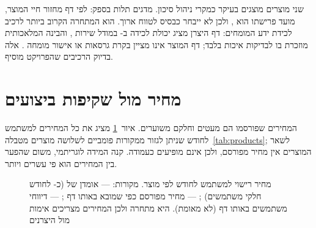 שני מוצרים מוצגים בעיקר כמקרי ניהול סיכון.  מדגים תלות בספק: לפי דף מחזור חיי המוצר, מועד
פרישתו הוא  \cite{microsoftguides}, ולכן לא ייבחר כבסיס לטווח ארוך.  הוא המתחרה הקרוב ביותר
לרכיב לכידת ידע המומחים: דף היצרן מציג יכולת לכידה ב- במודל שירות , והבינה המלאכותית מוזכרת בו לבדיקות איכות
בלבד; דף המוצר אינו מציין בקרת גרסאות או אישור מומחה \cite{vuforia}. אלה בדיוק הרכיבים שהפרויקט מוסיף.

\section{מחיר מול שקיפות ביצועים}\label{sec:pricecmp}
המחירים שפורסמו הם מעטים וחלקם משוערים. איור~\ref{fig:pricebar} מציג את כל המחירים למשתמש לחודש שניתן לגזור ממקורות
פומביים לשלושה מוצרים מטבלה~\ref{tab:products}; לשאר המוצרים אין מחיר מפורסם, ולכן אינם מופיעים כעמודה. קנה המידה לוגריתמי,
משום שהפער בין המחירים הוא פי עשרים ויותר.
\begin{figure}[!htbp]
\centering
{}
\caption[מחיר רישוי למשתמש לחודש]{מחיר רישוי למשתמש לחודש לפי מוצר. מקורות:  --- אומדן של  (כ- לחודש חלקי  משתמשים) \cite{manualto2026pricing};  --- מחיר מפורסם כפי שמובא באותו דף \cite{manualto2026pricing};  --- דיווחי משתמשים באותו דף (לא מאומת).  היא מתחרה ולכן המחירים מצריכים אימות מול היצרנים}\label{fig:pricebar}
\end{figure}

